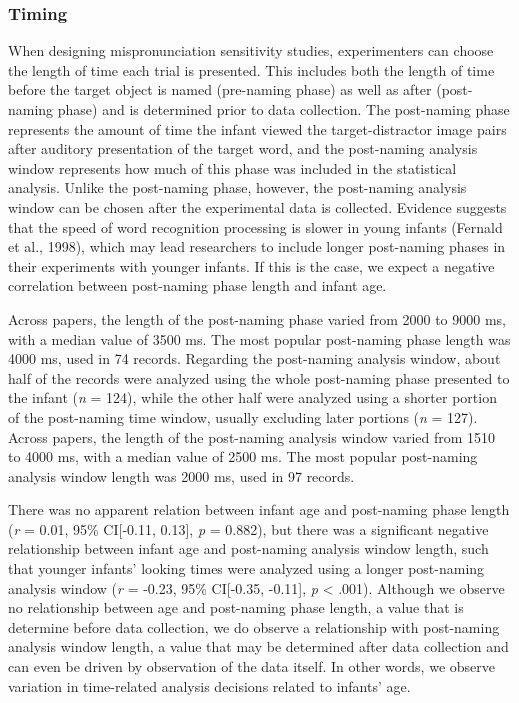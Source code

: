 \documentclass[man]{apa6}
\begin{document}
\hypertarget{timing}{%
\subsubsection{Timing}\label{timing}}

When designing mispronunciation sensitivity studies, experimenters can choose the length of time each trial is presented. This includes both the length of time before the target object is named (pre-naming phase) as well as after (post-naming phase) and is determined prior to data collection. The post-naming phase represents the amount of time the infant viewed the target-distractor image pairs after auditory presentation of the target word, and the post-naming analysis window represents how much of this phase was included in the statistical analysis. Unlike the post-naming phase, however, the post-naming analysis window can be chosen after the experimental data is collected. Evidence suggests that the speed of word recognition processing is slower in young infants (Fernald et al., 1998), which may lead researchers to include longer post-naming phases in their experiments with younger infants. If this is the case, we expect a negative correlation between post-naming phase length and infant age.

Across papers, the length of the post-naming phase varied from 2000 to 9000 ms, with a median value of 3500 ms. The most popular post-naming phase length was 4000 ms, used in 74 records. Regarding the post-naming analysis window, about half of the records were analyzed using the whole post-naming phase presented to the infant (\emph{n} = 124), while the other half were analyzed using a shorter portion of the post-naming time window, usually excluding later portions (\emph{n} = 127). Across papers, the length of the post-naming analysis window varied from 1510 to 4000 ms, with a median value of 2500 ms.
The most popular post-naming analysis window length was 2000 ms, used in 97 records.

There was no apparent relation between infant age and post-naming phase length (\emph{r} = 0.01, 95\% CI{[}-0.11, 0.13{]}, \emph{p} = 0.882), but there was a significant negative relationship between infant age and post-naming analysis window length, such that younger infants' looking times were analyzed using a longer post-naming analysis window (\emph{r} = -0.23, 95\% CI{[}-0.35, -0.11{]}, \emph{p} \textless{} .001). Although we observe no relationship between age and post-naming phase length, a value that is determine before data collection, we do observe a relationship with post-naming analysis window length, a value that may be determined after data collection and can even be driven by observation of the data itself. In other words, we observe variation in time-related analysis decisions related to infants' age.
\end{document}
